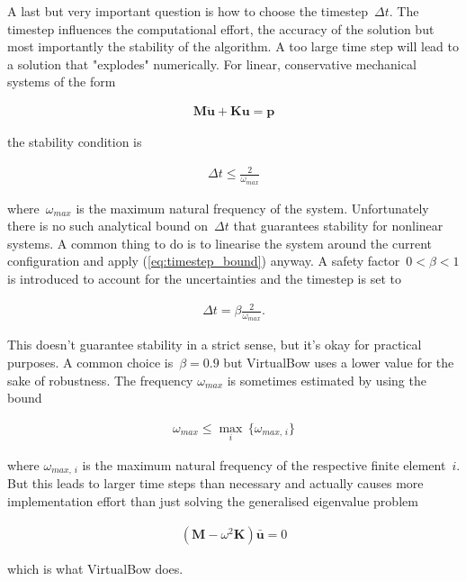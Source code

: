 A last but very important question is how to choose the timestep~$\Delta t$.
The timestep influences the computational effort, the accuracy of the solution but most importantly the stability of the algorithm.
A too large time step will lead to a solution that "explodes" numerically.
For linear, conservative mechanical systems of the form

\begin{align}
\boldsymbol{M}\ddot{\boldsymbol{u}} + \boldsymbol{K}\boldsymbol{u} = \boldsymbol{p}
\end{align}

the stability condition is

\begin{align}
\Delta t \le \frac{2}{\omega_{max}}\label{eq:timestep_bound}
\end{align}

where~$\omega_{max}$ is the maximum natural frequency \cite{bib:dynamic_solution} of the system.
Unfortunately there is no such analytical bound on~$\Delta t$ that guarantees stability for nonlinear systems.
A common thing to do is to linearise the system around the current configuration and apply (\ref{eq:timestep_bound}) anyway.
A safety factor~$0 < \beta < 1$ is introduced to account for the uncertainties and the timestep is set to

\begin{align}
\Delta t = \beta \frac{2}{\omega_{max}}.
\end{align}

This doesn't guarantee stability in a strict sense, but it's okay for practical purposes. A common choice is~$\beta = 0.9$ but VirtualBow uses a lower value for the sake of robustness. The frequency $\omega_{max}$ is sometimes estimated by using the bound

\begin{align}
\omega_{max} \le \max_{i}\,\{\omega_{max,\,i}\}
\end{align}

where $\omega_{max,\,i}$ is the maximum natural frequency of the respective finite element~$i$. But this leads to larger time steps than necessary and actually causes more implementation effort than just solving the generalised eigenvalue problem

\begin{align}
\left(\boldsymbol{M} - \omega^2\boldsymbol{K}\right)\boldsymbol{\bar{u}} = 0\label{eq:natural_frequencies}
\end{align}

which is what VirtualBow does.

